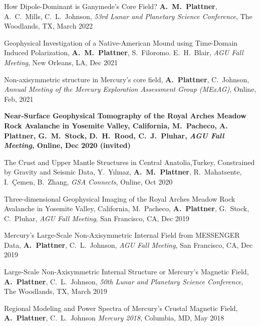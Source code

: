 \documentclass[10pt]{article}
\begin{document}
\spcp
\hspace{-0.4cm} \gr \hspace{-0.03cm} How Dipole-Dominant is Ganymede’s Core Field? \textbf{A.~M.~Plattner}, A.~C.~Mills, C.~L.~Johnson, \emph{53rd Lunar and Planetary Science Conference},
The Woodlands, TX, March 2022


\spcp
Geophysical Investigation of a Native-American Mound using Time-Domain Induced Polarization, \textbf{A.~M.~Plattner}, S.~Filoromo. E.~H.~Blair, \emph{AGU Fall Meeting}, New Orleans, LA, Dec 2021


\spcp
Non-axisymmetric structure in Mercury's core field, \textbf{A.~Plattner}, C.~Johnson, \emph{Annual Meeting of the Mercury Exploration Assessment Group (MExAG)}, Online, Feb, 2021

\spcp
\hspace{-0.4cm} \gr \hspace{-0.03cm} \textbf{Near-Surface Geophysical Tomography of the Royal Arches Meadow Rock Avalanche in Yosemite Valley, California, M.~Pacheco, {\normalfont A. Plattner}, G.~M.~Stock, D.~H.~Rood, C.~J.~Pluhar, \emph{AGU Fall Meeting}, Online, Dec 2020 (invited)}

\spcp
\hspace{-0.4cm} \gr \hspace{-0.03cm} The Crust and Upper Mantle Structures in Central Anatolia,Turkey, Constrained by Gravity and Seismic Data, Y.~Y\i lmaz, \textbf{A.~M.~Plattner}, R.~Mahatsente, I.~\c Cemen, B.~Zhang, \emph{GSA Connects}, Online, Oct 2020

\spcp
\hspace{-0.4cm} \gr \hspace{-0.03cm} Three-dimensional Geophysical Imaging of the Royal Arches Meadow Rock Avalanche in Yosemite Valley, California, M.~Pacheco, \textbf{A.~Plattner}, G.~Stock, C.~Pluhar, \emph{AGU Fall Meeting}, San Francisco, CA, Dec 2019

\spcp
Mercury's Large-Scale Non-Axisymmetric Internal Field from MESSENGER Data, \textbf{A.~Plattner}, C.~L.~Johnson, \emph{AGU Fall Meeting}, San Francisco, CA, Dec 2019

\spcp
Large-Scale Non-Axisymmetric Internal Structure or Mercury's Magnetic Field,
\textbf{A.~Plattner}, C.~L.~Johnson, \emph{50th Lunar and Planetary Science Conference},
The Woodlands, TX, March 2019

\spcp
Regional Modeling and Power Spectra of Mercury's Crustal Magnetic Field, \textbf{A.~Plattner}, C.\ L.\ Johnson \emph{Mercury 2018}, Columbia, MD, May 2018 
\end{document}
